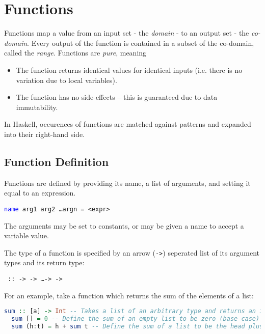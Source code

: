 \section{Functions}

Functions map a value from an input set - the \textit{domain} - to an output set - the \textit{co-domain}. Every output of the function is contained in a subset of the co-domain, called the \textit{range}.
Functions are \textit{pure}, meaning
\begin{itemize}
  \item The function returns identical values for identical inputs (i.e. there is no variation due to local variables).
  \item The function has no side-effects -- this is guaranteed due to data immutability.
\end{itemize}

In Haskell, occurences of functions are matched against patterns and expanded into their right-hand side.

\subsection{Function Definition}
Functions are defined by providing its name, a list of arguments, and setting it equal to an expression.

\begin{center}
  \texttt{\textcolor{blue}{name} arg1 arg2 \ldots argn = <expr>}
\end{center}

The arguments may be set to constants, or may be given a name to accept a variable value.

The type of a function is specified by an arrow (\texttt{->}) seperated list of its argument types and its return type:

\begin{center}
  \texttt{ ::  ->  -> \ldots ->  -> }
\end{center}

For an example, take a function which returns the sum of the elements of a list:

\begin{lstlisting}[language=haskell]
  sum :: [a] -> Int -- Takes a list of an arbitrary type and returns an integer
  sum [] = 0 -- Define the sum of an empty list to be zero (base case)
  sum (h:t) = h + sum t -- Define the sum of a list to be the head plus the sum of the tail
\end{lstlisting}

